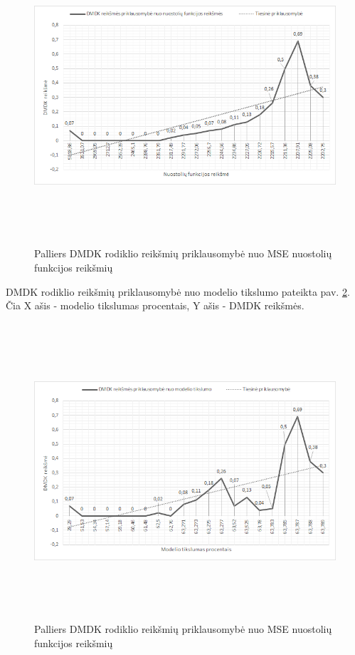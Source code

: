 \documentclass{VUMIFInfBakalaurinis}
\begin{document}
\begin{figure}[h]
  \centering
  \includegraphics[width=14cm,height=11cm,keepaspectratio]{img/pal_tyr_1.png}
  \caption{Palliers DMDK rodiklio reikšmių priklausomybė nuo MSE nuostolių funkcijos reikšmių}
  \label{fig:Palliers DMDK rodiklio reikšmių priklausomybė nuo MSE nuostolių funkcijos reikšmių}
\end{figure}

\par DMDK rodiklio reikšmių priklausomybė nuo modelio tikslumo pateikta pav. \ref{fig:Palliers DMDK rodiklio reikšmių priklausomybė nuo MSE nuostolių funkcijos reikšmių}. Čia X ašis - modelio tikslumas procentais, Y ašis - DMDK reikšmės.

\begin{figure}[h]
  \centering
  \includegraphics[width=14cm,height=11cm,keepaspectratio]{img/pal_tyr_2.png}
  \caption{Palliers DMDK rodiklio reikšmių priklausomybė nuo MSE nuostolių funkcijos reikšmių}
  \label{fig:Palliers DMDK rodiklio reikšmių priklausomybė nuo MSE nuostolių funkcijos reikšmių}
\end{figure}
\end{document}
